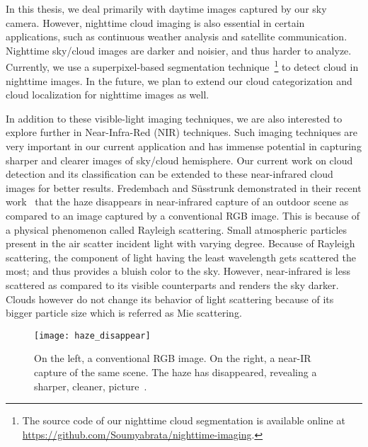In this thesis, we deal primarily with daytime images captured by our sky camera. However, nighttime cloud imaging is also essential in certain applications, such as continuous weather analysis and satellite communication. Nighttime sky/cloud images are darker and noisier, and thus harder to analyze. Currently, we use a superpixel-based segmentation technique~\footnote{The source code of our nighttime cloud segmentation is available online at \url{https://github.com/Soumyabrata/nighttime-imaging}.} to detect cloud in nighttime images. In the future, we plan to extend our cloud categorization and cloud localization for nighttime images as well.

In addition to these visible-light imaging techniques, we are also interested to explore further in Near-Infra-Red (NIR) techniques. Such imaging techniques are very important in our current application and has immense potential in capturing sharper and clearer images of sky/cloud hemisphere. Our current work on cloud detection and its classification can be extended to these near-infrared cloud images for better results. Fredembach and S{\"u}sstrunk demonstrated in their recent work~\cite{near_infrared} that the haze disappears in near-infrared capture of an outdoor scene as compared to an image captured by a conventional RGB image. This is because of a physical phenomenon called Rayleigh scattering. Small atmospheric particles present in the air scatter incident light with varying degree. Because of Rayleigh scattering, the component of light having the least wavelength gets scattered the most; and thus provides a bluish color to the sky. However, near-infrared is less scattered as compared to its visible counterparts and renders the sky darker. Clouds however do not change its behavior of light scattering because of its bigger particle size which is referred as Mie scattering. 


\begin{figure}[htb]
\begin{center}
\texttt{[image: haze\_disappear]}
\caption[Illustration to show the benefits of near-IR capture in cloud imaging.]{On the left, a conventional RGB image. On the right, a near-IR capture of the same scene. The haze has disappeared, revealing a sharper, cleaner, picture~\cite{near_infrared}.\label{fig:haze_disappear}}
\end{center}
\end{figure}

